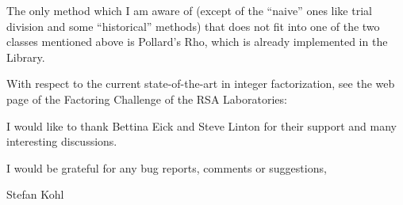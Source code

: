 The only method which I am aware of (except of the ``naive'' ones like
trial division and some ``historical'' methods)
that does not fit into one of the two classes mentioned above is
Pollard's Rho, which is already implemented in the {\GAP}  Library.

With respect to the current state-of-the-art in integer factorization,
see the web page of the 
Factoring Challenge of the RSA Laboratories:

I would like to thank Bettina Eick and Steve Linton for their support
and many interesting discussions.

I would be grateful for any bug reports, comments or suggestions,

\vfill%

\hfill                 Stefan Kohl

